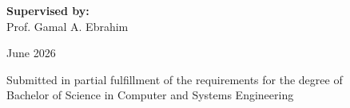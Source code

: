 \begin{titlepage}
\begin{center}
        \vspace{1.5cm}
        
        {\fontsize{12pt}{16pt}\selectfont \textbf{Supervised by:}}\\[0.3cm]
        {\fontsize{12pt}{16pt}\selectfont Prof. Gamal A. Ebrahim}
        
        \vspace{1.5cm}
        
        {\fontsize{12pt}{16pt}\selectfont June 2026}
        
        \vfill
        
        {\fontsize{11pt}{14pt}\selectfont Submitted in partial fulfillment of the requirements for the degree of}\\[0.2cm]
        {\fontsize{11pt}{14pt}\selectfont Bachelor of Science in Computer and Systems Engineering}
        
    \end{center}
\end{titlepage}
